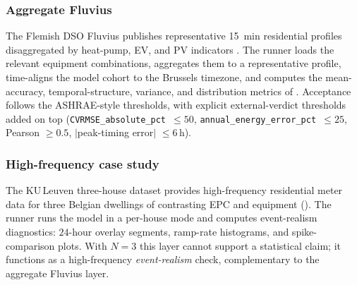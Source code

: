 \subsubsection*{Aggregate Fluvius}
The Flemish DSO Fluvius publishes representative \SI{15}{min} residential profiles disaggregated by heat-pump, EV, and PV indicators \cite{Fluvius2024OpenData}. The runner loads the relevant equipment combinations, aggregates them to a representative profile, time-aligns the model cohort to the Brussels timezone, and computes the mean-accuracy, temporal-structure, variance, and distribution metrics of . Acceptance follows the ASHRAE-style thresholds, with explicit external-verdict thresholds added on top (\texttt{CVRMSE\_absolute\_pct $\le 50$}, \texttt{annual\_energy\_error\_pct $\le 25$}, Pearson $\ge 0.5$, $|$peak-timing error$|$ $\le 6\,$h).

\subsubsection*{High-frequency case study}
The KU\,Leuven three-house dataset \cite{KULeuven3House} provides high-frequency residential meter data for three Belgian dwellings of contrasting EPC and equipment (). The runner runs the model in a per-house mode and computes event-realism diagnostics: $24$-hour overlay segments, ramp-rate histograms, and spike-comparison plots. With $N=3$ this layer cannot support a statistical claim; it functions as a high-frequency \emph{event-realism} check, complementary to the aggregate Fluvius layer.



